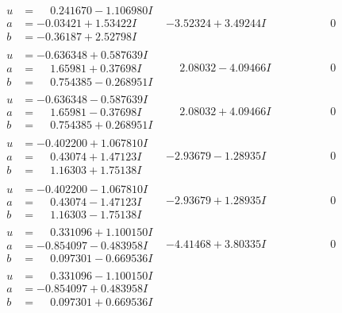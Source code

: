 \documentclass[1p]{elsarticle_modified}
\theoremstyle{definition}
\begin{document}
$$\begin{array}{c|c|c}
\begin{aligned}
u &= \phantom{-}0.241670 - 1.106980 I \\
a &= -0.03421 + 1.53422 I \\
b &= -0.36187 + 2.52798 I\end{aligned}
 & -3.52324 + 3.49244 I & \phantom{-0.000000 } 0 \\ \hline\begin{aligned}
u &= -0.636348 + 0.587639 I \\
a &= \phantom{-}1.65981 + 0.37698 I \\
b &= \phantom{-}0.754385 - 0.268951 I\end{aligned}
 & \phantom{-}2.08032 - 4.09466 I & \phantom{-0.000000 } 0 \\ \hline\begin{aligned}
u &= -0.636348 - 0.587639 I \\
a &= \phantom{-}1.65981 - 0.37698 I \\
b &= \phantom{-}0.754385 + 0.268951 I\end{aligned}
 & \phantom{-}2.08032 + 4.09466 I & \phantom{-0.000000 } 0 \\ \hline\begin{aligned}
u &= -0.402200 + 1.067810 I \\
a &= \phantom{-}0.43074 + 1.47123 I \\
b &= \phantom{-}1.16303 + 1.75138 I\end{aligned}
 & -2.93679 - 1.28935 I & \phantom{-0.000000 } 0 \\ \hline\begin{aligned}
u &= -0.402200 - 1.067810 I \\
a &= \phantom{-}0.43074 - 1.47123 I \\
b &= \phantom{-}1.16303 - 1.75138 I\end{aligned}
 & -2.93679 + 1.28935 I & \phantom{-0.000000 } 0 \\ \hline\begin{aligned}
u &= \phantom{-}0.331096 + 1.100150 I \\
a &= -0.854097 - 0.483958 I \\
b &= \phantom{-}0.097301 - 0.669536 I\end{aligned}
 & -4.41468 + 3.80335 I & \phantom{-0.000000 } 0 \\ \hline\begin{aligned}
u &= \phantom{-}0.331096 - 1.100150 I \\
a &= -0.854097 + 0.483958 I \\
b &= \phantom{-}0.097301 + 0.669536 I\end{aligned}

\end{array}$$
\end{document}
